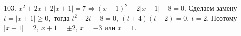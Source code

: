 103. $x^2+2x+2|x+1|=7\Leftrightarrow (x+1)^2+2|x+1|-8=0.$ Сделаем замену $t=|x+1|\geqslant0,$ тогда $t^2+2t-8=0,\ (t+4)(t-2)=0,\ t=2.$ Поэтому $|x+1|=2,\ x+1=\pm2,\ x=-3$ или $x=1.$\\

